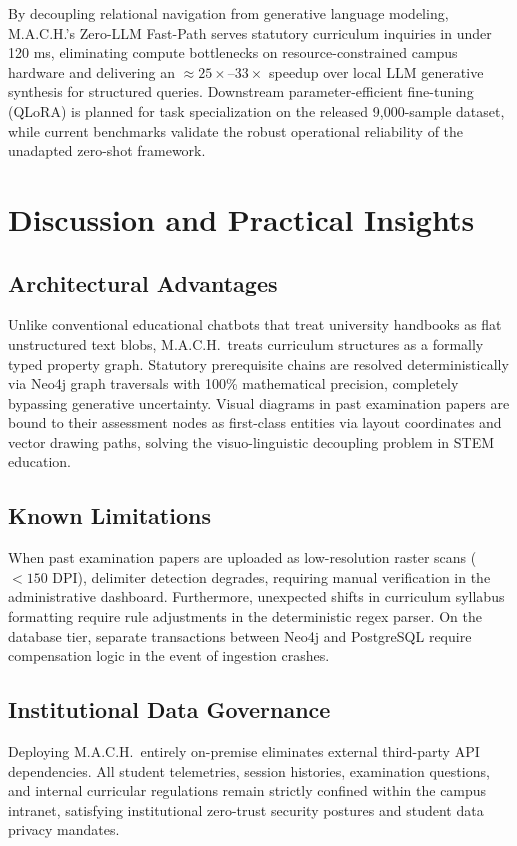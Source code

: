 \documentclass[conference]{IEEEtran}
\begin{document}
By decoupling relational navigation from generative language modeling, M.A.C.H.'s Zero-LLM Fast-Path serves statutory curriculum inquiries in under 120 ms, eliminating compute bottlenecks on resource-constrained campus hardware and delivering an $\approx 25\times$--$33\times$ speedup over local LLM generative synthesis for structured queries. Downstream parameter-efficient fine-tuning (QLoRA) is planned for task specialization on the released 9,000-sample dataset, while current benchmarks validate the robust operational reliability of the unadapted zero-shot framework.

\section{Discussion and Practical Insights}\label{sec:discussion}

\subsection{Architectural Advantages}
Unlike conventional educational chatbots that treat university handbooks as flat unstructured text blobs, M.A.C.H.\ treats curriculum structures as a formally typed property graph. Statutory prerequisite chains are resolved deterministically via Neo4j graph traversals with 100\% mathematical precision, completely bypassing generative uncertainty. Visual diagrams in past examination papers are bound to their assessment nodes as first-class entities via layout coordinates and vector drawing paths, solving the visuo-linguistic decoupling problem in STEM education.

\subsection{Known Limitations}\label{sec:limits}
When past examination papers are uploaded as low-resolution raster scans ($<150$ DPI), delimiter detection degrades, requiring manual verification in the administrative dashboard. Furthermore, unexpected shifts in curriculum syllabus formatting require rule adjustments in the deterministic regex parser. On the database tier, separate transactions between Neo4j and PostgreSQL require compensation logic in the event of ingestion crashes.

\subsection{Institutional Data Governance}
Deploying M.A.C.H.\ entirely on-premise eliminates external third-party API dependencies. All student telemetries, session histories, examination questions, and internal curricular regulations remain strictly confined within the campus intranet, satisfying institutional zero-trust security postures and student data privacy mandates.
\end{document}
